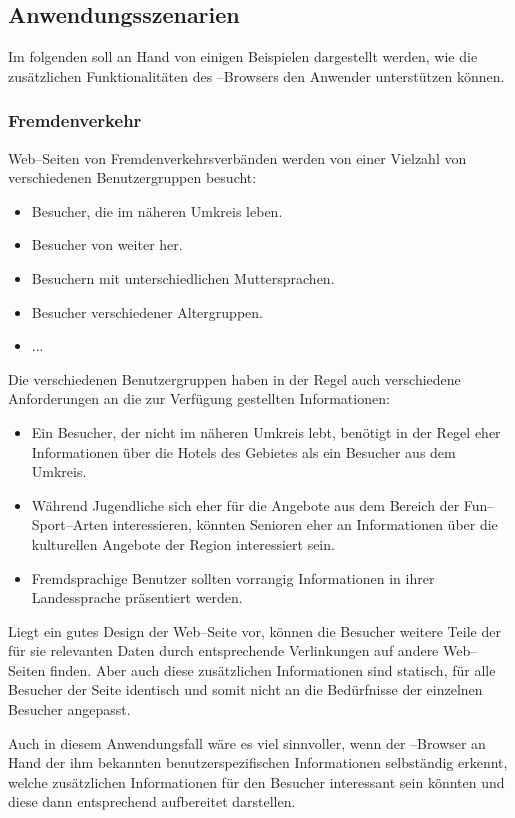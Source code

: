 \subsection{Anwendungsszenarien}
Im folgenden soll an Hand von einigen Beispielen dargestellt werden,
wie die zusätzlichen Funktionalitäten des \SECH--Browsers den Anwender
unterstützen können.

\subsubsection{Fremdenverkehr}
Web--Seiten von Fremdenverkehrsverbänden werden von einer 
Vielzahl von verschiedenen Benutzergruppen besucht:
\begin{itemize}
     \item Besucher, die im näheren Umkreis leben.
     \item Besucher von weiter her.
     \item Besuchern mit unterschiedlichen Muttersprachen.
     \item Besucher verschiedener Altergruppen.
     \item ...
\end{itemize}
Die verschiedenen Benutzergruppen haben in der Regel auch verschiedene
Anforderungen an die zur Verfügung gestellten Informationen:
\begin{itemize}
     \item Ein Besucher, der nicht im näheren Umkreis lebt, benötigt
    in der Regel eher Informationen über die Hotels des Gebietes als ein
    Besucher aus dem Umkreis.
     \item Während Jugendliche sich eher für die Angebote aus dem Bereich
    der Fun--Sport--Arten interessieren, könnten Senioren eher an
    Informationen über die kulturellen Angebote der Region
    interessiert sein.
     \item Fremdsprachige Benutzer sollten vorrangig Informationen in
    ihrer Landessprache präsentiert werden.
\end{itemize}

Liegt ein gutes Design der Web--Seite vor, können die Besucher weitere Teile
der für sie relevanten Daten durch entsprechende Verlinkungen auf
andere Web--Seiten finden. Aber auch diese zusätzlichen Informationen
sind statisch, für alle Besucher der Seite identisch und somit nicht
an die Bedürfnisse der einzelnen Besucher angepasst.

Auch in diesem Anwendungsfall wäre es viel sinnvoller, wenn der
\SECH--Browser an Hand der ihm bekannten benutzerspezifischen
Informationen selbständig erkennt, welche zusätzlichen Informationen
für den Besucher interessant sein könnten und diese dann entsprechend
aufbereitet darstellen.

